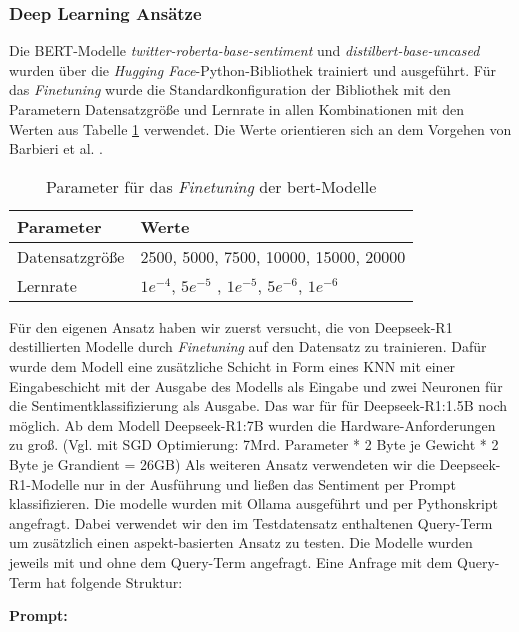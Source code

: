 \subsubsection{Deep Learning Ansätze} \label{sec:deep-learning-ansaetze}
Die BERT-Modelle \textit{twitter-roberta-base-sentiment} und \textit{distilbert-base-uncased} wurden über die \textit{Hugging Face}-Python-Bibliothek trainiert und ausgeführt.
Für das \textit{Finetuning} wurde die Standardkonfiguration der Bibliothek mit den Parametern Datensatzgröße und Lernrate in allen Kombinationen mit den Werten aus Tabelle \ref{tab:dl-params} verwendet.
Die Werte orientieren sich an dem Vorgehen von Barbieri et al. \cite{barbieri2020tweeteval}.
\begin{table}
    \begin{tabular}{ll}
        \toprule
        Parameter       & Werte                                                   \\
        \midrule
        Datensatzgröße  & 2500, 5000, 7500, 10000, 15000, 20000                   \\
        Lernrate        & $1e^{-4}$, $5e^{-5}$ , $1e^{-5}$, $5e^{-6}$, $1e^{-6}$  \\
        \bottomrule
    \end{tabular}
    \caption{Parameter für das \textit{Finetuning} der \gls{bert}-Modelle}
    \label{tab:dl-params}
\end{table}


Für den eigenen Ansatz haben wir zuerst versucht, die von Deepseek-R1 destillierten Modelle durch \textit{Finetuning} auf den Datensatz zu trainieren. Dafür wurde dem Modell eine zusätzliche Schicht in Form eines KNN mit einer Eingabeschicht mit der Ausgabe des Modells als Eingabe und zwei Neuronen für die Sentimentklassifizierung als Ausgabe.
Das war für für Deepseek-R1:1.5B noch möglich. Ab dem Modell Deepseek-R1:7B wurden die Hardware-Anforderungen zu groß. (Vgl. mit SGD Optimierung: 7Mrd. Parameter * 2 Byte je Gewicht * 2 Byte je Grandient = 26GB)
Als weiteren Ansatz verwendeten wir die Deepseek-R1-Modelle nur in der Ausführung und ließen das Sentiment per Prompt klassifizieren. Die modelle wurden mit Ollama ausgeführt und per Pythonskript angefragt. Dabei verwendet wir den im Testdatensatz enthaltenen Query-Term um zusätzlich einen aspekt-basierten Ansatz zu testen.
Die Modelle wurden jeweils mit und ohne dem Query-Term angefragt. Eine Anfrage mit dem Query-Term hat folgende Struktur:

\textbf{Prompt:} 

